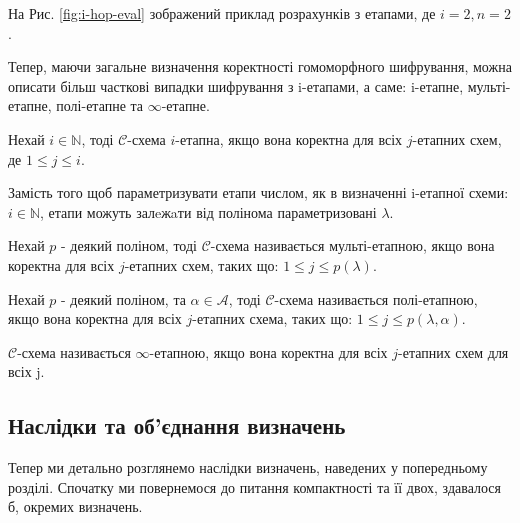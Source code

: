 На Рис. \ref{fig:i-hop-eval} зображений приклад розрахунків з етапами, де \(i=2,n=2\).

Тепер, маючи загальне визначення коректності гомоморфного шифрування, можна описати більш
часткові випадки шифрування з i-етапами, а саме: i-етапне, мульті-етапне, полі-етапне та
\(\infty\)-етапне.

\begin{definition}
    \label{def:i-stages}
    Нехай \(i \in \mathbb{N}\), тоді \(\mathcal{C}\)-схема \(i\)-етапна, якщо вона
    коректна для всіх \(j\)-етапних схем, де \(1 \leq j \leq i\).
\end{definition}

Замість того щоб параметризувати етапи числом, як в визначенні i-етапної схеми: \(i \in 
\mathbb{N}\), етапи можуть залeжaти від полінома параметризовані \(\lambda\).

\begin{definition}
    \label{def:multi-stages}
    Нехай \(p\) - деякий поліном, тоді \(\mathcal{C}\)-схема називається мульті-етапною,
якщо вона коректна для всіх \(j\)-етапних схем, таких  що: \(1 \leq j \leq p(\lambda)\).
\end{definition}

\begin{definition}
    \label{def:poli-stages}
    Нехай \(p\) - деякий поліном, та \(\alpha \in \mathcal{A}\), тоді 
    \(\mathcal{C}\)-схема називається полі-етапною, якщо вона коректна для 
    всіх \(j\)-етапних схема, таких  що: \(1 \leq j \leq p(\lambda, \alpha)\).
\end{definition}

\begin{definition}
    \label{def:inf-stages}
    \(\mathcal{C}\)-схема називається \(\infty\)-етапною, якщо вона коректна для всіх \(j\)-етапних схем для всіх j.
\end{definition}

\subsection{Наслідки та об'єднання визначень}
Тепер ми детально розглянемо наслідки визначень, наведених у попередньому розділі. Спочатку
ми повернемося до питання компактності та її двох, здавалося б, окремих визначень.

